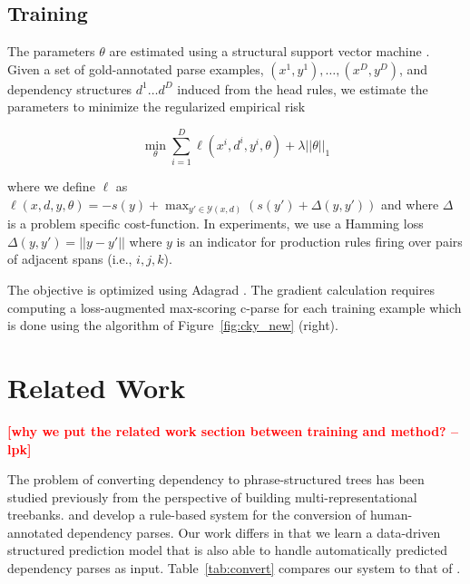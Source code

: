 \documentclass[11pt,letterpaper]{article}
\newcommand{\lpkcomment}[1]{\textcolor{red}{\bf \small [#1 --lpk]}}
\begin{document}
\subsection{Training}

The parameters $\theta$ are estimated using a structural support
vector machine \cite{taskar-04}.
Given a set of gold-annotated parse examples, $(x^{1}, y^{1}), \ldots,
(x^{D}, y^{D})$, and dependency structures $d^{1} \ldots d^{D}$ induced
from the head rules, we estimate the
parameters to minimize the regularized empirical risk

\[ \min_{\theta} \sum_{i = 1}^D  \ell( x^{i}, d^{i} , y^{i}, \theta)  + \lambda ||\theta||_1 \]

\noindent where we define $\ell$ as
$\ell(x, d, y, \theta) = - s(y) + \max_{y' \in \mathcal{Y}(x, d)}\left(s(y')  + \Delta(y, y') \right) $
\noindent and where $\Delta$ is a problem specific cost-function.
In experiments, we use a Hamming loss  $\Delta(y, y') = || y -y'||$
where $y$ is an indicator for production rules firing over pairs of
adjacent spans (i.e., $i, j, k$).

The objective is optimized using Adagrad \cite{duchi2011adaptive}.  The gradient
calculation requires computing a loss-augmented max-scoring c-parse for each
training example which is done using the algorithm of
Figure~\ref{fig:cky_new} (right).


\section{Related Work}
\lpkcomment{why we put the related work section between training and method?}

The problem of converting dependency to phrase-structured trees has
been studied previously from the perspective of building
multi-representational treebanks.   and
 develop a rule-based system for the
conversion of human-annotated dependency parses. Our work differs in that
we learn a data-driven structured prediction model that is also able
to handle automatically predicted dependency parses as input. Table~\ref{tab:convert} compares
our system to that of .
\end{document}
